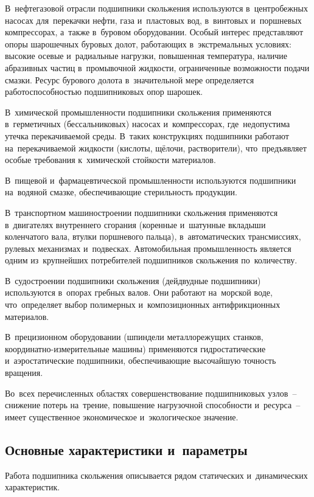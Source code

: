 В~нефтегазовой отрасли подшипники скольжения используются в~центробежных насосах для~перекачки нефти, газа и~пластовых вод, в~винтовых и~поршневых компрессорах, а~также в~буровом оборудовании. Особый интерес представляют опоры шарошечных буровых долот, работающих в~экстремальных условиях: высокие осевые и~радиальные нагрузки, повышенная температура, наличие абразивных частиц в~промывочной жидкости, ограниченные возможности подачи смазки. Ресурс бурового долота в~значительной мере определяется работоспособностью подшипниковых опор шарошек.

В~химической промышленности подшипники скольжения применяются в~герметичных (бессальниковых) насосах и~компрессорах, где~недопустима утечка перекачиваемой среды. В~таких конструкциях подшипники работают на~перекачиваемой жидкости (кислоты, щёлочи, растворители), что~предъявляет особые требования к~химической стойкости материалов.

В~пищевой и~фармацевтической промышленности используются подшипники на~водяной смазке, обеспечивающие стерильность продукции.

В~транспортном машиностроении подшипники скольжения применяются в~двигателях внутреннего сгорания (коренные и~шатунные вкладыши коленчатого вала, втулки поршневого пальца), в~автоматических трансмиссиях, рулевых механизмах и~подвесках. Автомобильная промышленность является одним из~крупнейших потребителей подшипников скольжения по~количеству.

В~судостроении подшипники скольжения (дейдвудные подшипники) используются в~опорах гребных валов. Они работают на~морской воде, что~определяет выбор полимерных и~композиционных антифрикционных материалов.

В~прецизионном оборудовании (шпиндели металлорежущих станков, координатно-измерительные машины) применяются гидростатические и~аэростатические подшипники, обеспечивающие высочайшую точность вращения.

Во~всех перечисленных областях совершенствование подшипниковых узлов~-- снижение потерь на~трение, повышение нагрузочной способности и~ресурса~-- имеет существенное экономическое и~экологическое значение.

\subsection{Основные характеристики и~параметры}

Работа подшипника скольжения описывается рядом статических и~динамических характеристик.


